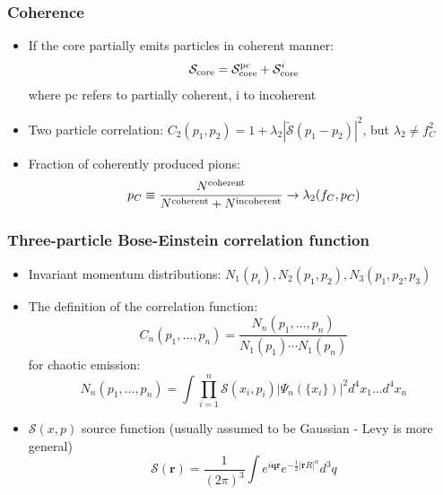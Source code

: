\documentclass{beamer}
\begin{document}
\begin{frame}
\frametitle{Coherence}
\begin{itemize}
\setlength{\itemsep}{28pt}
\item If the core partially emits particles in coherent manner:
\begin{equation*}
\mathcal{S}_{\rm core}=\mathcal{S}_{\rm core}^{\rm pc}+\mathcal{S}_{\rm core}^{i}
\end{equation*}
where pc refers to partially coherent, i to incoherent

\item Two particle correlation: $C_2(p_1, p_2) =  1+\lambda_2|\mathcal{\tilde{S}}(p_1-p_2)|^2$, but $\lambda_2 \neq f_C^2$
\item Fraction of coherently produced pions:
\begin{equation*}
p_C \equiv \frac{N^{\rm coherent}}{N^{\rm coherent}+N^{\rm incoherent}} \rightarrow \lambda_2(f_C, p_C)
\end{equation*}
\end{itemize}
\end{frame}

\begin{frame}
\frametitle{Three-particle Bose-Einstein correlation function}
\begin{itemize}
\setlength{\itemsep}{8pt}
\item Invariant momentum distributions: $N_1(p_i), N_2(p_1,p_2),N_3(p_1, p_2, p_3)$
\item The definition of the correlation function:
\begin{equation*}
C_n(p_1,\dots,p_n)=\frac{N_n(p_1,\dots,p_n)}{N_1(p_1)\cdots N_1(p_n)}
\end{equation*}
 for chaotic emission:
\begin{equation*}
N_n(p_1,\dots,p_n)=\int \prod_{i=1}^{n}\mathcal{S}(x_i,p_i)|\Psi_{n}(\{x_i\})|^2 d^4x_1\dots d^4x_n
\end{equation*}
\item $\mathcal{S}(x,p)$ source function (usually assumed to be Gaussian - Levy is more general)
\begin{equation}
\mathcal{S}(\bm{r}) = \frac{1}{(2\pi)^3} \int e^{i\bm{qr}}e^{-\frac{1}{2}|\bm{r}R|^\alpha}d^3q
\end{equation}
\end{itemize}
\end{frame}
\end{document}
